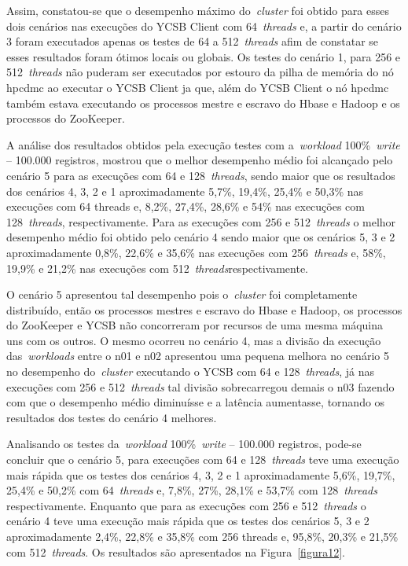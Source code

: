 \documentclass[12pt]{article}
\begin{document}
Assim, constatou-se que o desempenho máximo do~\emph{cluster}  foi obtido para esses dois cenários nas execuções do YCSB Client com 64~\emph{threads} e, a partir do cenário 3 foram executados apenas os testes de 64 a 512~\emph{threads} afim de constatar se esses resultados foram ótimos locais ou globais. 
Os testes do cenário 1, para 256 e 512~\emph{threads} não puderam ser executados por estouro da pilha de memória do nó hpcdmc ao executar o YCSB Client ja que, além do YCSB Client o nó hpcdmc também estava executando os processos mestre e escravo do Hbase e Hadoop e os processos do ZooKeeper.

A análise dos resultados obtidos pela execução testes com a~\emph{workload} 100\%~\emph{write} -- 100.000 registros, mostrou que o melhor desempenho médio foi alcançado pelo cenário 5 para as execuções com 64 e 128~\emph{threads}, sendo maior que os resultados dos cenários 4, 3, 2 e 1 aproximadamente 5,7\%, 19,4\%, 25,4\% e 50,3\% nas execuções com 64 threads e, 8,2\%, 27,4\%, 28,6\% e 54\% nas execuções com 128~\emph{threads}, respectivamente.
Para as execuções com 256 e 512~\emph{threads} o melhor desempenho médio foi obtido pelo cenário 4 sendo maior que os cenários 5, 3 e 2 aproximadamente 0,8\%, 22,6\% e 35,6\% nas execuções com 256~\emph{threads} e, 58\%, 19,9\% e 21,2\% nas execuções com 512~\emph{threads}respectivamente.

O cenário 5 apresentou tal desempenho pois o~\emph{cluster}  foi completamente distribuído, então os processos mestres e escravo do Hbase e Hadoop, os processos do ZooKeeper e YCSB não concorreram por recursos de uma mesma máquina uns com os outros.
O mesmo ocorreu no cenário 4, mas a divisão da execução das~\emph{workloads} entre o n01 e n02 apresentou uma pequena melhora no cenário 5 no desempenho do~\emph{cluster}  executando
o YCSB com 64 e 128~\emph{threads}, já nas execuções com 256 e 512~\emph{threads} tal divisão sobrecarregou demais o n03 fazendo com que o desempenho médio diminuísse e a latência aumentasse, tornando os resultados dos testes do cenário 4 melhores.

Analisando os testes da~\emph{workload} 100\%~\emph{write} -- 100.000 registros, pode-se concluir que o cenário 5, para execuções com 64 e 128~\emph{threads} teve uma execução mais rápida que os testes dos cenários 4, 3, 2 e 1 aproximadamente 5,6\%, 19,7\%, 25,4\% e 50,2\% com 64~\emph{threads} e, 7,8\%, 27\%, 28,1\% e 53,7\% com 128~\emph{threads} respectivamente. 
Enquanto que para as execuções com 256 e 512~\emph{threads} o cenário 4 teve uma execução mais rápida que os testes dos cenários 5, 3 e 2 aproximadamente 2,4\%, 22,8\% e 35,8\% com 256 threads e, 95,8\%, 20,3\% e 21,5\% com 512~\emph{threads}. 
Os resultados são apresentados na Figura~\ref{figura12}.
\end{document}
